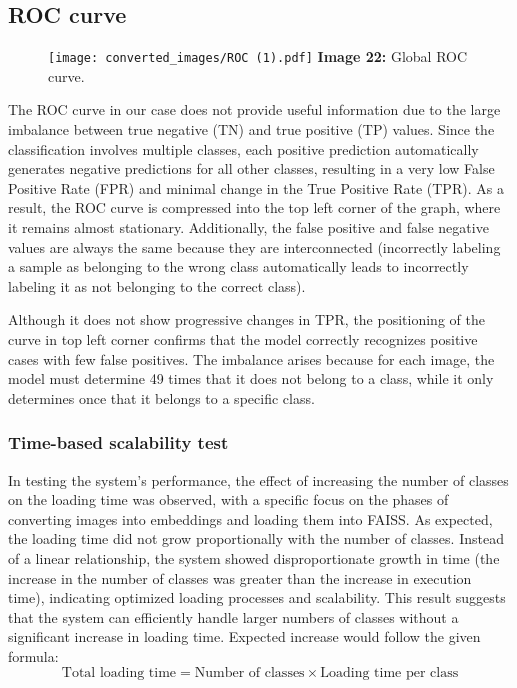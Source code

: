 \documentclass{article}
\begin{document}
\subsection*{ROC curve}
\hspace*{1.00cm}
\begin{figure}[H]
    \centering
    \texttt{[image: converted\_images/ROC (1).pdf]}
    \textbf{Image 22:} Global ROC curve.
\end{figure}

\hspace*{1.00cm}The ROC curve \cite{hoo2017roc} in our case does not provide useful information due to the large imbalance between true negative (TN) and true positive (TP) values. Since the classification involves multiple classes, each positive prediction automatically generates negative predictions for all other classes, resulting in a very low False Positive Rate (FPR) and minimal change in the True Positive Rate (TPR). As a result, the ROC curve is compressed into the top left corner of the graph, where it remains almost stationary. Additionally, the false positive and false negative values are always the same because they are interconnected (incorrectly labeling a sample as belonging to the wrong class automatically leads to incorrectly labeling it as not belonging to the correct class).

\hspace*{1.00cm}Although it does not show progressive changes in TPR, the positioning of the curve in top left corner confirms that the model correctly recognizes positive cases with few false positives. The imbalance arises because for each image, the model must determine 49 times that it does not belong to a class, while it only determines once that it belongs to a specific class.

\subsubsection*{Time-based scalability test}
 \hspace*{1.00cm}In testing the system's performance, the effect of increasing the number of classes on the loading time was observed, with a specific focus on the phases of converting images into embeddings and loading them into FAISS. \cite{scepanski2024ai}As expected, the loading time did not grow proportionally with the number of classes. Instead of a linear relationship, the system showed disproportionate growth in time (the increase in the number of classes was greater than the increase in execution time), indicating optimized loading processes and scalability. This result suggests that the system can efficiently handle larger numbers of classes without a significant increase in loading time. Expected increase would follow the given formula:
\begin{equation}
\text{Total loading time} = \text{Number of classes} \times \text{Loading time per class}
\end{equation}
\end{document}
